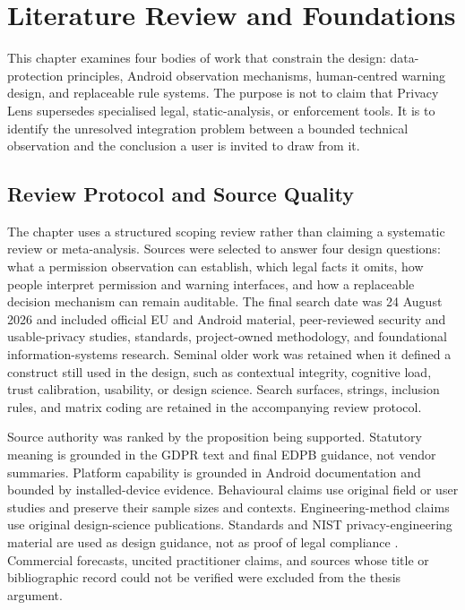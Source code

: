 \section{Literature Review and Foundations}

This chapter examines four bodies of work that constrain the design: data-protection principles, Android observation mechanisms, human-centred warning design, and replaceable rule systems. The purpose is not to claim that Privacy Lens supersedes specialised legal, static-analysis, or enforcement tools. It is to identify the unresolved integration problem between a bounded technical observation and the conclusion a user is invited to draw from it.

\subsection{Review Protocol and Source Quality}

The chapter uses a structured scoping review rather than claiming a systematic review or meta-analysis. Sources were selected to answer four design questions: what a permission observation can establish, which legal facts it omits, how people interpret permission and warning interfaces, and how a replaceable decision mechanism can remain auditable. The final search date was 24 August 2026 and included official EU and Android material, peer-reviewed security and usable-privacy studies, standards, project-owned methodology, and foundational information-systems research. Seminal older work was retained when it defined a construct still used in the design, such as contextual integrity, cognitive load, trust calibration, usability, or design science. Search surfaces, strings, inclusion rules, and matrix coding are retained in the accompanying review protocol.

Source authority was ranked by the proposition being supported. Statutory meaning is grounded in the GDPR text and final EDPB guidance, not vendor summaries. Platform capability is grounded in Android documentation and bounded by installed-device evidence. Behavioural claims use original field or user studies and preserve their sample sizes and contexts. Engineering-method claims use original design-science publications. Standards and NIST privacy-engineering material are used as design guidance, not as proof of legal compliance \cite{nist8062,nistprivacy2020}. Commercial forecasts, uncited practitioner claims, and sources whose title or bibliographic record could not be verified were excluded from the thesis argument.


